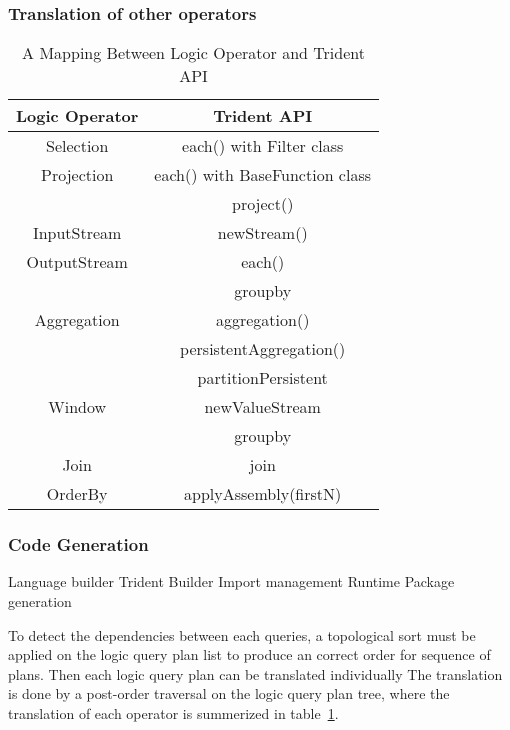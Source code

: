 \documentclass[conference, twocolumn, twoside, 11pt]{IEEEtran}
\theoremstyle{definition}
\begin{document}
\subsubsection{Translation of other operators}
\begin{table}[!t]
\caption{A Mapping Between Logic Operator and Trident API}
\label{api-mapping}
\centering
\begin{tabular}{|c|c|}
\hline
Logic Operator & Trident API \\
\hline
Selection      & each() with Filter class \\
\hline
Projection     & each() with BaseFunction class \\
               & project() \\
\hline
InputStream    & newStream() \\
\hline
OutputStream   & each() \\
\hline
               & groupby       \\
Aggregation    & aggregation() \\
               & persistentAggregation() \\
\hline
               & partitionPersistent \\ 
Window         & newValueStream      \\ 
               & groupby             \\
\hline
Join           & join                 \\
\hline
OrderBy        & applyAssembly(firstN) \\
\hline
\end{tabular}
\end{table}
\subsubsection{Code Generation}
Language builder
Trident Builder
Import management
Runtime Package generation

To detect the dependencies between each queries, a topological sort must be applied on the logic query plan list to produce an correct order for sequence of plans. Then each logic query plan can be translated individually 
The translation is done by a post-order traversal on the logic query plan tree, where the translation of each operator is summerized in table~\ref{api-mapping}.
\end{document}
